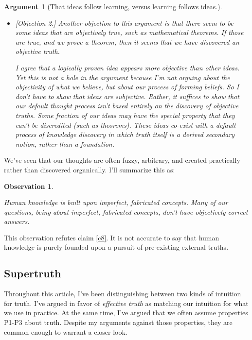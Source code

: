 \documentclass[11pt, oneside]{article}   	%
\newtheorem{obs}{Observation}
\newtheorem{argt}{Argument}
\begin{document}
\begin{argt}[That ideas follow learning, versus learning follows ideas.]
\begin{itemize}
    \item{} [Objection 2.]
        Another objection to this argument is that there seem to be some ideas
        that are objectively true, such as mathematical theorems. If
        those are true, and we prove a theorem, then it seems that we have
        discovered an objective truth.

        I agree that a logically proven idea appears more objective than other
        ideas.
        Yet this is not a hole in the argument because I'm not arguing about the
        objectivity of what we believe, but about our process of forming
        beliefs.
        So I don't have to show that ideas are subjective.
        Rather, it suffices to show that our default thought process isn't based
        entirely on the discovery of objective truths.
        Some fraction of our
        ideas may have the special property that they can't be discredited
        (such as theorems).
        These ideas co-exist with a default process of knowledge discovery in
        which truth itself is a derived secondary notion, rather than a
        foundation.
\end{itemize}
\end{argt}

We've seen that our thoughts are often fuzzy, arbitrary, and created practically
rather than discovered organically. I'll summarize this as:
\newcommand{\obsnine}{
Human knowledge is
built upon imperfect, fabricated concepts.
Many of our questions, being about imperfect,
fabricated concepts,
don't have objectively correct answers.
}
\begin{obs}\label{o9}
    \obsnine
\end{obs}

This observation refutes claim \ref{c8}.
It is not accurate to say that human knowledge is purely founded upon a
pursuit of pre-existing external truths.

\subsection{Supertruth}\label{supertruth}

Throughout this article, I've been distinguishing between two kinds of intuition
for truth.
I've argued in favor of {\em effective truth} as matching our intuition for what
we use in practice.
At the same time, I've argued that we often assume properties P1-P3 about truth.
Despite my arguments against those properties, they are common enough to warrant
a closer look.
\end{document}

